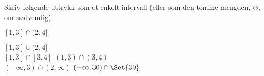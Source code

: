 \documentclass[a4paper,11pt]{article}
\begin{document}
\begin{problem}
  \label{problem:1.2-1b-oving-01-2019-MAT-0001} Skriv følgende uttrykk som et
  enkelt intervall (eller som den tomme mengden, $\varnothing$, om nødvendig)
  \begin{tabenum}%
    \tabenumitem \hypertarget{subproblem:1.2-1b-oving-01-2019-MAT-0001}{$[1, 3] \cap (2, 4]$}
    \tabenumitem \hypertarget{subproblem:1.2-1b-oving-01-2019-MAT-0001}{$[1, 3] \cup (2, 4]$} \\[1ex]
    \tabenumitem \hypertarget{subproblem:1.2-1b-oving-01-2019-MAT-0001}{$[1, 3] \cap [3, 4]$}
    \tabenumitem \hypertarget{subproblem:1.2-1b-oving-01-2019-MAT-0001}{$(1, 3) \cap (3, 4)$} \\[1ex]
    \tabenumitem \hypertarget{subproblem:1.2-1b-oving-01-2019-MAT-0001}{$(-\infty, 3) \cap (2, \infty)$}
    \tabenumitem \hypertarget{subproblem:1.2-1b-oving-01-2019-MAT-0001}{$(-\infty,30) \cap \Set{30}$}
  \end{tabenum}
\end{problem}
\end{document}
